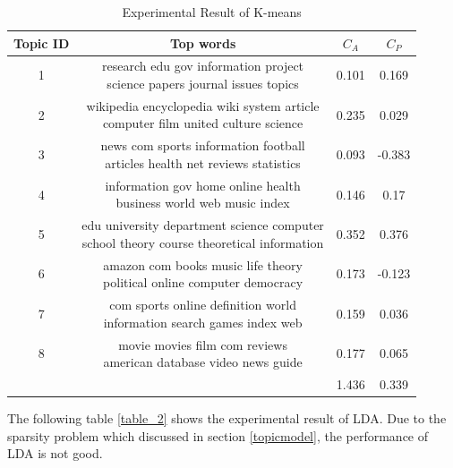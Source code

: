 \begin{table}[htbp]
\centering
\begin{tabular}{|c|c|c|c|}
\hline
Topic ID & Top words & $C_A$ & $C_P$\\
\hline
1 & \tabincell{l}{research edu gov information project \\science papers journal issues topics} & 0.101 & 0.169\\
\hline
2 & \tabincell{l}{wikipedia encyclopedia wiki system article \\computer film united culture science} & 0.235 & 0.029\\
\hline
3 &\tabincell{l}{news com sports information football \\articles health net reviews statistics} & 0.093 & -0.383\\
\hline
4 & \tabincell{l}{information gov home online health \\business world web music index} & 0.146 & 0.17\\
\hline
5 & \tabincell{l}{edu university department science computer \\school theory course theoretical information} & 0.352 & 0.376\\
\hline
6 & \tabincell{l}{amazon com books music life theory \\political online computer democracy} & 0.173 & -0.123\\
\hline
7 & \tabincell{l}{com sports online definition world \\information search games index web} & 0.159 & 0.036\\
\hline
8 & \tabincell{l}{movie movies film com reviews \\american database video news guide} & 0.177 & 0.065\\
\hline
 & & 1.436 & 0.339\\
\hline
\end{tabular}
\caption{Experimental Result of K-means}
\label{table_1}
\end{table}

The following table \ref{table_2} shows the experimental result of LDA. Due to the sparsity problem which discussed in section \ref{topicmodel}, the performance of LDA is not good. 

